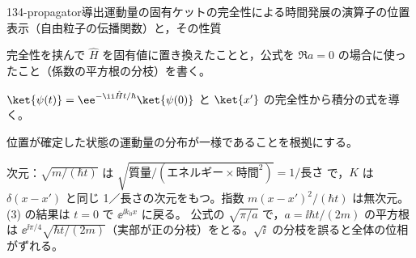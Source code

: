 \documentclass[uplatex,dvipdfmx,a4paper,11pt]{jsarticle}
\begin{document}
\begin{mondai}{134-propagator}{導出}{運動量の固有ケットの完全性による時間発展の演算子の位置表示（自由粒子の伝播関数）と，その性質}
\begin{tadashii}
\begin{ronten}
  \item {} 完全性を挟んで $\hat{H}$ を固有値に置き換えたことと，公式を $\Re a=0$ の場合に使ったこと（係数の平方根の分枝）を書く。
  \item {} $\ket{\psi(t)}=\ee^{-\ii\hat{H}t/\hbar}\ket{\psi(0)}$ と $\ket{x'}$ の完全性から積分の式を導く。
  \item {} 位置が確定した状態の運動量の分布が一様であることを根拠にする。
\end{ronten}
\kenzan 次元：$\sqrt{m/(\hbar t)}$ は $\sqrt{\text{質量}/(\text{エネルギー}\times\text{時間}^{2})}=1/\text{長さ}$ で，$K$ は $\delta(x-x')$ と同じ 1／長さの次元をもつ。指数 $m(x-x')^{2}/(\hbar t)$ は無次元。(3) の結果は $t=0$ で $\ee^{\ii k_{0}x}$ に戻る。
\tsumazuki 公式の $\sqrt{\pi/a}$ で，$a=\ii\hbar t/(2m)$ の平方根は $\ee^{\ii\pi/4}\sqrt{\hbar t/(2m)}$（実部が正の分枝）をとる。$\sqrt{\ii}$ の分枝を誤ると全体の位相がずれる。
\end{tadashii}
\end{mondai}

\noteowari
\end{document}
